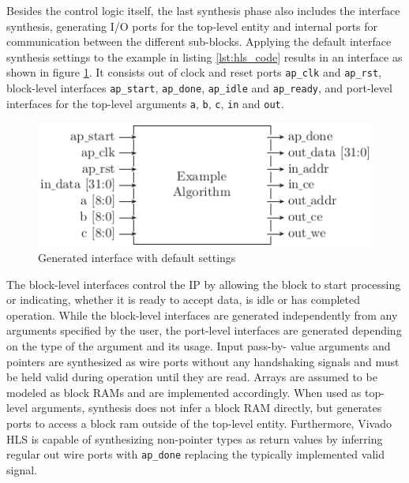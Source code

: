 Besides the control logic itself, the last synthesis phase also includes the
interface synthesis, generating I/O ports for the top-level entity and
internal ports for communication between the different sub-blocks. Applying
the default interface synthesis settings to the example in listing
\ref{lst:hls_code} results in an interface as shown in figure
\ref{fig:hls_if}. It consists out of clock and reset ports
\lstinline{ap_clk} and \lstinline{ap_rst}, block-level interfaces
\lstinline{ap_start}, \lstinline{ap_done}, \lstinline{ap_idle} and
\lstinline{ap_ready}, and port-level interfaces for the top-level arguments
\lstinline{a}, \lstinline{b}, \lstinline{c}, \lstinline{in} and
\lstinline{out}.
\begin{figure}[tb]
	\centering
	\includegraphics{../figures/hls_if}
	\caption{Generated interface with default settings}
	\label{fig:hls_if}
\end{figure}
The block-level interfaces control the \ac{IP} by allowing the block to start
processing or indicating, whether it is ready to accept data, is idle or has
completed operation. While the block-level interfaces are generated
independently from any arguments specified by the user, the port-level
interfaces are generated depending on the type of the argument and its usage.
Input pass-by- value arguments and pointers are synthesized as wire ports
without any handshaking signals and must be held valid during operation until
they are read. Arrays are assumed to be modeled as block \acp{RAM} and are
implemented accordingly. When used as top-level arguments, synthesis does not
infer a block \ac{RAM} directly, but generates ports to access a block ram
outside of the top-level entity. Furthermore, Vivado HLS is capable of
synthesizing non-pointer types as return values by inferring regular out wire
ports with \lstinline{ap_done} replacing the typically implemented valid
signal.

